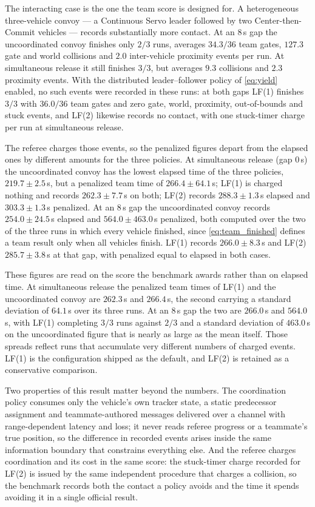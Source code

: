 The interacting case is the one the team score is designed for. A heterogeneous
three-vehicle convoy --- a Continuous Servo leader followed by two
Center-then-Commit vehicles --- records substantially more contact. At an $8$\,s
gap the uncoordinated convoy finishes only $2/3$ runs, averages $34.3/36$ team
gates, $127.3$ gate and world collisions and $2.0$ inter-vehicle proximity events
per run. At simultaneous release it still finishes $3/3$, but averages $9.3$
collisions and $2.3$ proximity events. With the distributed leader--follower
policy of \eqref{eq:yield} enabled, no such events were recorded in these runs:
at both gaps LF(1) finishes $3/3$ with $36.0/36$ team gates and zero gate,
world, proximity, out-of-bounds and stuck events, and LF(2) likewise records no
contact, with one stuck-timer charge per run at simultaneous release.

The referee charges those events, so the penalized figures depart from the
elapsed ones by different amounts for the three policies. At simultaneous
release (gap $0$\,s) the uncoordinated convoy has the lowest elapsed time of the
three policies, $219.7\pm2.5$\,s, but a penalized team time of
$266.4\pm64.1$\,s; LF(1) is charged nothing and records $262.3\pm7.7$\,s on
both; LF(2) records $288.3\pm1.3$\,s elapsed and $303.3\pm1.3$\,s penalized.
At an $8$\,s gap the
uncoordinated convoy records $254.0\pm24.5$\,s elapsed and $564.0\pm463.0$\,s
penalized, both computed over the two of the three runs in which every vehicle
finished, since \eqref{eq:team_finished} defines a team result only when all
vehicles finish. LF(1) records $266.0\pm8.3$\,s and LF(2) $285.7\pm3.8$\,s at
that gap, with penalized equal to elapsed in both cases.

These figures are read on the score the benchmark awards rather than on elapsed
time. At simultaneous release the penalized team times of LF(1) and the
uncoordinated convoy are $262.3$\,s and $266.4$\,s, the second carrying a
standard deviation of $64.1$\,s over its three runs. At an $8$\,s gap the two
are $266.0$\,s and $564.0$\,s, with LF(1) completing $3/3$ runs against $2/3$
and a standard deviation of $463.0$\,s on the uncoordinated figure that is
nearly as large as the mean itself. Those spreads reflect runs that accumulate
very different numbers of charged events. LF(1) is the configuration shipped as
the default, and LF(2) is retained as a conservative comparison.

Two properties of this result matter beyond the numbers. The coordination policy
consumes only the vehicle's own tracker state, a static predecessor assignment
and teammate-authored messages delivered over a channel with range-dependent
latency and loss; it never reads referee progress or a teammate's true position,
so the difference in recorded events arises inside the same information boundary
that constrains everything else. And the referee charges coordination and its
cost in the same score: the stuck-timer charge recorded for LF(2) is issued by
the same independent procedure that charges a collision, so the benchmark
records both the contact a policy avoids and the time it spends avoiding it in a
single official result.

